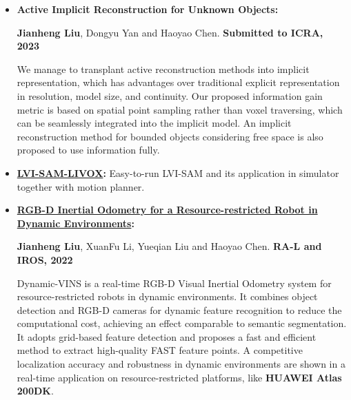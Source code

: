 \documentclass[11pt,a4paper,sans]{moderncv}        %
\begin{document}
\begin{itemize}

    \item \textbf{Active Implicit Reconstruction for Unknown Objects:} 

\textbf{Jianheng Liu}, Dongyu Yan and Haoyao Chen. \textbf{Submitted to ICRA, 2023}

We manage to transplant active reconstruction methods into
implicit representation, which has advantages over
traditional explicit representation in resolution, model
size, and continuity.
Our proposed information gain metric is based on spatial
point sampling rather than voxel traversing, which can be
seamlessly integrated into the implicit model.
An implicit reconstruction method for bounded objects
considering free space is also proposed to use information
fully.

\item \textbf{\href{https://github.com/jianhengLiu/LVI-SAM-LIVOX}{LVI-SAM-LIVOX}:} Easy-to-run LVI-SAM and its application in simulator together with motion planner.

\item \textbf{\href{https://github.com/HITSZ-NRSL/Dynamic-VINS.git}{RGB-D Inertial Odometry for a Resource-restricted Robot in Dynamic Environments}:} 

\textbf{Jianheng Liu}, XuanFu Li, Yueqian Liu and Haoyao Chen. \textbf{RA-L and IROS, 2022}

Dynamic-VINS is a real-time RGB-D Visual Inertial Odometry system for resource-restricted robots in dynamic environments. It combines object detection and RGB-D cameras for dynamic feature recognition to reduce the computational cost, achieving an effect comparable to semantic segmentation. It adopts grid-based feature detection and proposes a fast and efficient method to extract high-quality FAST feature points. A competitive localization accuracy and robustness in dynamic environments are shown in a real-time application on resource-restricted platforms, like \textbf{HUAWEI Atlas 200DK}.



\end{itemize}
\end{document}
